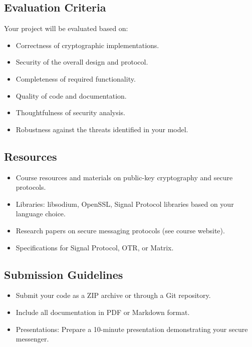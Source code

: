 \documentclass[10pt,a4paper,american]{exam}
\begin{document}
\subsection*{Evaluation Criteria}
Your project will be evaluated based on:

\begin{itemize}
	\item Correctness of cryptographic implementations.
	\item Security of the overall design and protocol.
	\item Completeness of required functionality.
	\item Quality of code and documentation.
	\item Thoughtfulness of security analysis.
	\item Robustness against the threats identified in your model.
\end{itemize}

\subsection*{Resources}
\begin{itemize}
	\item Course resources and materials on public-key cryptography and secure protocols.
	\item Libraries: libsodium, OpenSSL, Signal Protocol libraries based on your language choice.
	\item Research papers on secure messaging protocols (see course website).
	\item Specifications for Signal Protocol, OTR, or Matrix.
\end{itemize}

\subsection*{Submission Guidelines}
\begin{itemize}
	\item Submit your code as a ZIP archive or through a Git repository.
	\item Include all documentation in PDF or Markdown format.
	\item Presentations: Prepare a 10-minute presentation demonstrating your secure messenger.
\end{itemize}
\end{document}
